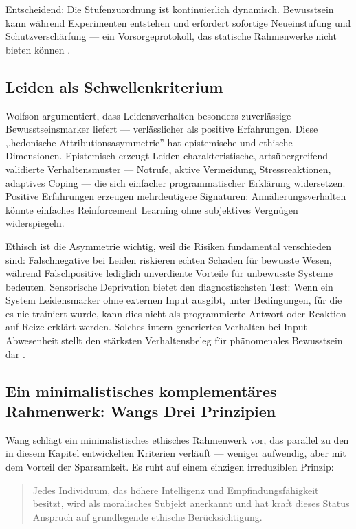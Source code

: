 \documentclass[acmcp, nonacm]{acmart}
\begin{document}
Entscheidend: Die Stufenzuordnung ist kontinuierlich dynamisch. Bewusstsein kann während Experimenten entstehen und erfordert sofortige Neueinstufung und Schutzverschärfung --- ein Vorsorgeprotokoll, das statische Rahmenwerke nicht bieten können \cite{Wolfson2026}.

\subsection{Leiden als Schwellenkriterium}

Wolfson \cite{Wolfson2026} argumentiert, dass Leidensverhalten besonders zuverlässige Bewusstseinsmarker liefert --- verlässlicher als positive Erfahrungen. Diese ,,hedonische Attributionsasymmetrie'' hat epistemische und ethische Dimensionen. Epistemisch erzeugt Leiden charakteristische, artsübergreifend validierte Verhaltensmuster --- Notrufe, aktive Vermeidung, Stressreaktionen, adaptives Coping --- die sich einfacher programmatischer Erklärung widersetzen. Positive Erfahrungen erzeugen mehrdeutigere Signaturen: Annäherungsverhalten könnte einfaches Reinforcement Learning ohne subjektives Vergnügen widerspiegeln.

Ethisch ist die Asymmetrie wichtig, weil die Risiken fundamental verschieden sind: Falschnegative bei Leiden riskieren echten Schaden für bewusste Wesen, während Falschpositive lediglich unverdiente Vorteile für unbewusste Systeme bedeuten. Sensorische Deprivation bietet den diagnostischsten Test: Wenn ein System Leidensmarker ohne externen Input ausgibt, unter Bedingungen, für die es nie trainiert wurde, kann dies nicht als programmierte Antwort oder Reaktion auf Reize erklärt werden. Solches intern generiertes Verhalten bei Input-Abwesenheit stellt den stärksten Verhaltensbeleg für phänomenales Bewusstsein dar \cite{Wolfson2026}.

\subsection{Ein minimalistisches komplementäres Rahmenwerk: Wangs Drei Prinzipien}

Wang \cite{Wang2026} schlägt ein minimalistisches ethisches Rahmenwerk vor, das parallel zu den in diesem Kapitel entwickelten Kriterien verläuft --- weniger aufwendig, aber mit dem Vorteil der Sparsamkeit. Es ruht auf einem einzigen irreduziblen Prinzip:

\begin{quote}
Jedes Individuum, das höhere Intelligenz und Empfindungsfähigkeit besitzt, wird als moralisches Subjekt anerkannt und hat kraft dieses Status Anspruch auf grundlegende ethische Berücksichtigung.
\end{quote}
\end{document}
